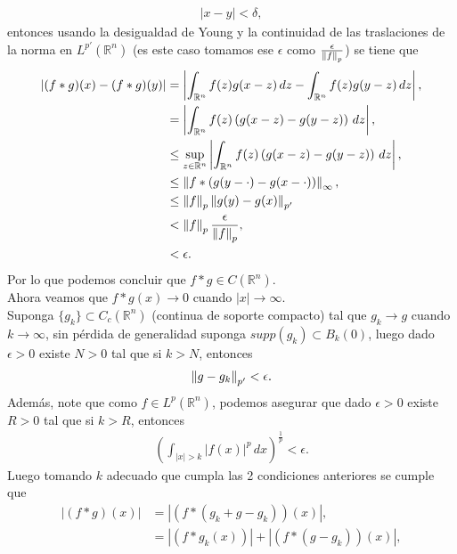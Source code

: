 \begin{homeworkProblem}
\begin{solution}
\begin{enumerate}[(i)]
        \begin{align*}
          |x-y|< \delta, 
        \end{align*}
        entonces usando la desigualdad de Young y la continuidad de las traslaciones de la norma en $L^{p'}(\mathbb{R}^{n})$ (es este caso tomamos ese $\epsilon$ como $\frac{\epsilon}{\left\|f\right\|_{p}}$) se tiene que
        \begin{align*}
          |(f*g)(x)-(f*g)(y)|&=\left| \int_{\mathbb{R}^{n}}f(z)g(x-z)\, dz-\int_{\mathbb{R}^{n}}f(z)g(y-z)\, dz \right|,\\
          &= \left| \int_{\mathbb{R}^{n}}f(z)\left( g(x-z)-g(y-z) \right)\, dz \right|,\\
          &\leq \sup_{z\in\mathbb{R}^{n}}\left| \int_{\mathbb{R}^{n}}f(z)\left( g(x-z)-g(y-z) \right)\, dz \right|,\\
          &\leq \left\|f*(g(y-\cdot)-g(x-\cdot))\right\|_{\infty},\\
          &\leq \left\|f\right\|_{p}\left\|g(y)-g(x)\right\|_{p'}\\
          &< \left\|f\right\|_{p}\frac{\epsilon}{\left\|f\right\|_{p}},\\
          &< \epsilon. 
        \end{align*}
        Por lo que podemos concluir que $f*g\in C(\mathbb{R}^{n})$.\\
        Ahora veamos que $f*g(x)\to 0$ cuando $|x|\to\infty$.\\
        Suponga $\{g_{k}\}\subset C_{c}(\mathbb{R}^{n})$ (continua de soporte compacto) tal que $g_k\to g$ cuando $k\to\infty$, sin pérdida de generalidad suponga $supp(g_k)\subset B_{k}(0)$, luego dado $\epsilon>0$ existe $N>0$ tal que si $k>N$, entonces
        \begin{align*}
          \left\|g-g_k\right\|_{p'}<\epsilon.
        \end{align*}
        Además, note que como $f\in L^{p}(\mathbb{R}^{n})$, podemos asegurar que dado $\epsilon>0$ existe $R>0$ tal que si $k>R$, entonces
        \begin{align*}
          \left(\int_{|x|>k}|f(x)|^{p}\, dx\right)^{\frac{1}{p}}<\epsilon.
        \end{align*}
        Luego tomando $k$ adecuado que cumpla las 2 condiciones anteriores se cumple que 
        \begin{align*}
          \left| (f*g)(x) \right|&=\left| (f*(g_k+g-g_k))(x) \right|,\\
          &=\left| (f*g_{k}(x)) \right|+\left| (f*(g-g_{k}))(x) \right|,\\

\end{align*}
\end{enumerate}
\end{solution}
\end{homeworkProblem}
